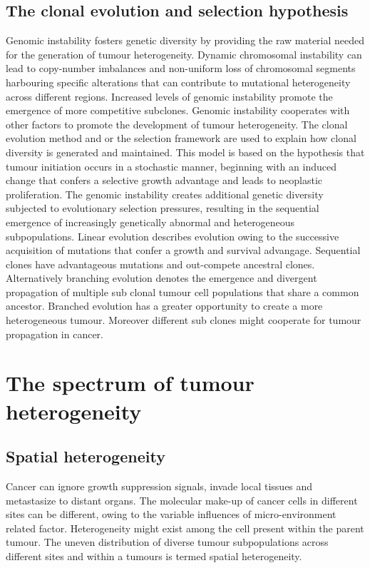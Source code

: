 	\subsection{The clonal evolution and selection hypothesis}
	Genomic instability fosters genetic diversity by providing the raw material needed for the generation of tumour heterogeneity.
	Dynamic chromosomal instability can lead to copy-number imbalances and non-uniform loss of chromosomal segments harbouring specific alterations that can contribute to mutational heterogeneity across different regions.
	Increased levels of genomic instability promote the emergence of more competitive subclones.
	Genomic instability cooperates with other factors to promote the development of tumour heterogeneity.
	The clonal evolution method and or the selection framework are used to explain how clonal diversity is generated and maintained.
	This model is based on the hypothesis that tumour initiation occurs in a stochastic manner, beginning with an induced change that confers a selective growth advantage and leads to neoplastic proliferation.
	The genomic instability creates additional genetic diversity subjected to evolutionary selection pressures, resulting in the sequential emergence of increasingly genetically abnormal and heterogeneous subpopulations.
	Linear evolution describes evolution owing to the successive acquisition of mutations that confer a growth and survival advangage.
	Sequential clones have advantageous mutations and out-compete ancestral clones.
	Alternatively branching evolution denotes the emergence and divergent propagation of multiple sub clonal tumour cell populations that share a common ancestor.
	Branched evolution has a greater opportunity to create a more heterogeneous tumour.
	Moreover different sub clones might cooperate for tumour propagation in cancer.

\section{The spectrum of tumour heterogeneity}

	\subsection{Spatial heterogeneity}
	Cancer can ignore growth suppression signals, invade local tissues and metastasize to distant organs.
	The molecular make-up of cancer cells in different sites can be different, owing to the variable influences of micro-environment related factor.
	Heterogeneity might exist among the cell present within the parent tumour.
	The uneven distribution of diverse tumour subpopulations across different sites and within a tumours is termed spatial heterogeneity.

